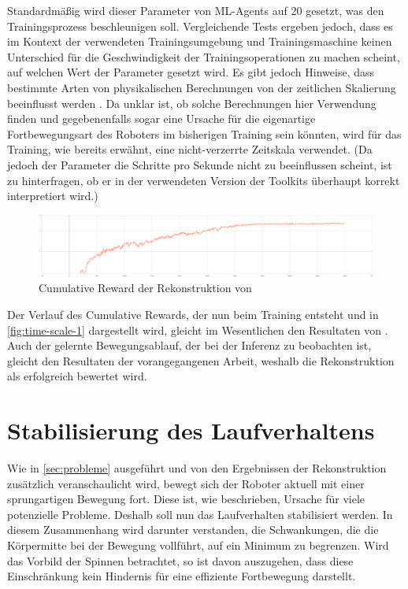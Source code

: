 Standardmäßig wird dieser Parameter von ML-Agents auf 20 gesetzt, was den Trainingsprozess beschleunigen soll.
Vergleichende Tests ergeben jedoch, dass es im Kontext der verwendeten Trainingsumgebung und Trainingsmaschine keinen Unterschied für die Geschwindigkeit der Trainingsoperationen zu machen scheint, auf welchen Wert der Parameter gesetzt wird.
Es gibt jedoch Hinweise, dass bestimmte Arten von physikalischen Berechnungen von der zeitlichen Skalierung beeinflusst werden \cite{zhang2021}.
Da unklar ist, ob solche Berechnungen hier Verwendung finden und gegebenenfalls sogar eine Ursache für die eigenartige Fortbewegungsart des Roboters im bisherigen Training sein könnten, wird für das Training, wie bereits erwähnt, eine nicht-verzerrte Zeitskala verwendet.
(Da jedoch der Parameter die Schritte pro Sekunde nicht zu beeinflussen scheint, ist zu hinterfragen, ob er in der verwendeten Version der Toolkits überhaupt korrekt interpretiert wird.)

\begin{figure}[H]
    \centering
    \includegraphics[width=\textwidth]{Bilder/ml-agents/Environment_Cumulative Reward_time-scale-1.pdf}
    \caption{Cumulative Reward der Rekonstruktion von \cite{waidner.2020}}
    \label{fig:time-scale-1}
\end{figure}

Der Verlauf des Cumulative Rewards, der nun beim Training entsteht und in \autoref{fig:time-scale-1} dargestellt wird, gleicht im Wesentlichen den Resultaten von \cite[50]{waidner.2020}.
Auch der gelernte Bewegungsablauf, der bei der Inferenz zu beobachten ist, gleicht den Resultaten der vorangegangenen Arbeit, weshalb die Rekonstruktion als erfolgreich bewertet wird.


\section{Stabilisierung des Laufverhaltens}
Wie in \autoref{sec:probleme} ausgeführt und von den Ergebnissen der Rekonstruktion zusätzlich veranschaulicht wird, bewegt sich der Roboter aktuell mit einer sprungartigen Bewegung fort.
Diese ist, wie beschrieben, Ursache für viele potenzielle Probleme.
Deshalb soll nun das Laufverhalten stabilisiert werden.
In diesem Zusammenhang wird darunter verstanden, die Schwankungen, die die Körpermitte bei der Bewegung vollführt, auf ein Minimum zu begrenzen.
Wird das Vorbild der Spinnen betrachtet, so ist davon auszugehen, dass diese Einschränkung kein Hindernis für eine effiziente Fortbewegung darstellt.

